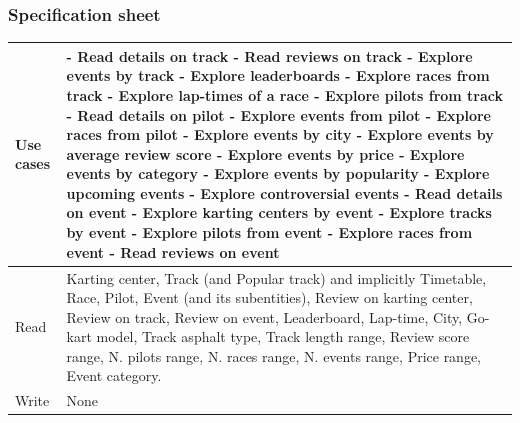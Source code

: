 \documentclass{beamer}
\begin{document}
\begin{frame}
    \frametitle{Specification sheet}
    \begin{table}
        \tiny
        \begin{tabular}{|p{2cm}|p{6cm}|}
        \hline
        Use cases &
        - Read details on track \newline
        - Read reviews on track \newline
        - Explore events by track \newline
        - Explore leaderboards \newline
        - Explore races from track \newline
        - Explore lap-times of a race \newline
        - Explore pilots from track \newline
        - Read details on pilot \newline
        - Explore events from pilot \newline
        - Explore races from pilot \newline
        - Explore events by city \newline
        - Explore events by average review score \newline
        - Explore events by price \newline
        - Explore events by category \newline
        - Explore events by popularity \newline
        - Explore upcoming events \newline
        - Explore controversial events \newline
        - Read details on event \newline
        - Explore karting centers by event \newline
        - Explore tracks by event \newline
        - Explore pilots from event \newline
        - Explore races from event \newline
        - Read reviews on event \\
        \hline
        Read & Karting center, Track (and Popular track) and implicitly Timetable, Race, Pilot, Event (and its subentities),
        Review on karting center, Review on track, Review on event, Leaderboard, Lap-time, \newline
        City, Go-kart model, Track asphalt type, Track length range, Review score range, N. pilots range,
        N. races range, N. events range, Price range, Event category. \\
        \hline
        Write & None \\
        \hline
        \end{tabular}
    \end{table}
\end{frame}
\end{document}
